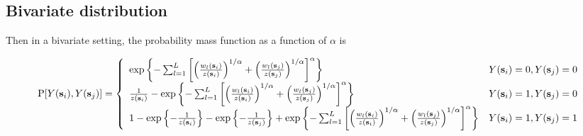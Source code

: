 \subsection{Bivariate distribution}\label{s:bivariate}
Then in a bivariate setting, the probability mass function as a function of $\alpha$ is
\begin{adjustwidth}{-0.25in}{}
{\footnotesize
\begin{align} \label{biv}
  \text{P}[Y(\mathbf{s}_i), Y(\mathbf{s}_j)] = \left\{ \begin{array}{ll}
    \exp \left\{ - \sum_{ l = 1 }^{ L } \left[ \left( \frac{ w_{ l }(\mathbf{s}_i) }{ z(\mathbf{s}_i) } \right)^{1/\alpha} + \left( \frac{ w_{l }(\mathbf{s}_j)}{z(\mathbf{s}_j)} \right)^{1/\alpha} \right]^{\alpha} \right\} &Y(\mathbf{s}_i) = 0, Y(\mathbf{s}_j) = 0\\
    \frac{ 1 }{z(\mathbf{s}_i)} - \exp \left\{ - \sum_{ l = 1 }^{ L } \left[ \left( \frac{ w_{ l }(\mathbf{s}_i) }{ z(\mathbf{s}_i) } \right)^{1/\alpha} + \left( \frac{ w_{l }(\mathbf{s}_j)}{z(\mathbf{s}_j)} \right)^{1/\alpha} \right]^{\alpha} \right\} &Y(\mathbf{s}_i) = 1, Y(\mathbf{s}_j) = 0 \\
    1 - \exp\left\{ - \frac{ 1 }{ z(\mathbf{s}_i) } \right\} - \exp \left\{ - \frac{ 1 }{z(\mathbf{s}_j)} \right\} + \exp \left\{ - \sum_{ l = 1 }^{ L } \left[ \left( \frac{ w_{ l }(\mathbf{s}_i) }{ z(\mathbf{s}_i) } \right)^{1/\alpha} + \left( \frac{ w_{l }(\mathbf{s}_j)}{z(\mathbf{s}_j)} \right)^{1/\alpha} \right]^{\alpha} \right\} &Y(\mathbf{s}_i) = 1, Y(\mathbf{s}_j) = 1
  \end{array} \right.
\end{align}
}
\end{adjustwidth}

